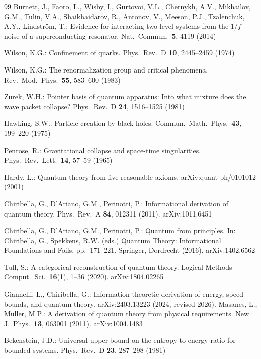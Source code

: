 \documentclass[11pt]{article}
\theoremstyle{remark}
\begin{document}
\begin{thebibliography}{99}
 Burnett, J., Faoro, L., Wisby, I., Gurtovoi, V.L., Chernykh, A.V., Mikhailov, G.M., Tulin, V.A., Shaikhaidarov, R., Antonov, V., Meeson, P.J., Tzalenchuk, A.Y., Lindstr\"om, T.: Evidence for interacting two-level systems from the $1/f$ noise of a superconducting resonator. Nat.\ Commun.\ \textbf{5}, 4119 (2014)

 Wilson, K.G.: Confinement of quarks. Phys.\ Rev.\ D \textbf{10}, 2445--2459 (1974)

 Wilson, K.G.: The renormalization group and critical phenomena. Rev.\ Mod.\ Phys.\ \textbf{55}, 583--600 (1983)

 Zurek, W.H.: Pointer basis of quantum apparatus: Into what mixture does the wave packet collapse? Phys.\ Rev.\ D \textbf{24}, 1516--1525 (1981)

 Hawking, S.W.: Particle creation by black holes. Commun.\ Math.\ Phys.\ \textbf{43}, 199--220 (1975)

 Penrose, R.: Gravitational collapse and space-time singularities. Phys.\ Rev.\ Lett.\ \textbf{14}, 57--59 (1965)

 Hardy, L.: Quantum theory from five reasonable axioms. arXiv:quant-ph/0101012 (2001)

 Chiribella, G., D'Ariano, G.M., Perinotti, P.: Informational derivation of quantum theory. Phys.\ Rev.\ A \textbf{84}, 012311 (2011). arXiv:1011.6451

 Chiribella, G., D'Ariano, G.M., Perinotti, P.: Quantum from principles. In: Chiribella, G., Spekkens, R.W. (eds.) Quantum Theory: Informational Foundations and Foils, pp.\ 171--221. Springer, Dordrecht (2016). arXiv:1402.6562

 Tull, S.: A categorical reconstruction of quantum theory. Logical Methods Comput.\ Sci.\ \textbf{16}(1), 1--36 (2020). arXiv:1804.02265

 Giannelli, L., Chiribella, G.: Information-theoretic derivation of energy, speed bounds, and quantum theory. arXiv:2403.13223 (2024, revised 2026).
 Masanes, L., M\"uller, M.P.: A derivation of quantum theory from physical requirements. New J.\ Phys.\ \textbf{13}, 063001 (2011). arXiv:1004.1483

 Bekenstein, J.D.: Universal upper bound on the entropy-to-energy ratio for bounded systems. Phys.\ Rev.\ D \textbf{23}, 287--298 (1981)


\end{thebibliography}
\end{document}
